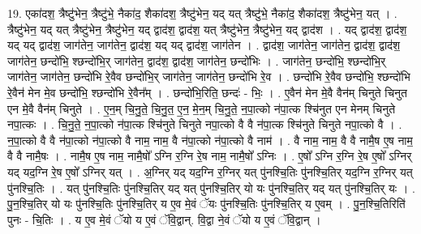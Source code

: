 \documentclass[17pt]{extarticle}
\begin{document}
19. एका॑दश॒ त्रैष्टु॑भेन॒ त्रैष्टु॑भे॒ नैका॑द॒ शैका॑दश॒ त्रैष्टु॑भेन॒ यद् यत् त्रैष्टु॑भे॒ नैका॑द॒ 
शैका॑दश॒ त्रैष्टु॑भेन॒ यत् । . त्रैष्टु॑भेन॒ यद् यत् त्रैष्टु॑भेन॒ त्रैष्टु॑भेन॒ यद् द्वाद॑श॒ द्वाद॑श॒ यत् त्रैष्टु॑भेन॒ त्रैष्टु॑भेन॒ यद् द्वाद॑श । . यद् द्वाद॑श॒ द्वाद॑श॒ यद् यद् द्वाद॑श॒ जाग॑तेन॒ जाग॑तेन॒ द्वाद॑श॒ यद् यद् द्वाद॑श॒ जाग॑तेन । . द्वाद॑श॒ जाग॑तेन॒ जाग॑तेन॒ द्वाद॑श॒ द्वाद॑श॒ जाग॑तेन॒ छन्दो॑भि॒ श्छन्दो॑भि॒र् जाग॑तेन॒ द्वाद॑श॒ द्वाद॑श॒ जाग॑तेन॒ छन्दो॑भिः । . जाग॑तेन॒ छन्दो॑भि॒ श्छन्दो॑भि॒र् जाग॑तेन॒ जाग॑तेन॒ छन्दो॑भि रे॒वैव छन्दो॑भि॒र् जाग॑तेन॒ जाग॑तेन॒ छन्दो॑भि रे॒व । . छन्दो॑भि रे॒वैव छन्दो॑भि॒ श्छन्दो॑भि रे॒वैन॑ मेन मे॒व छन्दो॑भि॒ श्छन्दो॑भि रे॒वैन᳚म् । . छन्दो॑भि॒रिति॒ छन्दः॑ - भिः॒ । . ए॒वैन॑ मेन मे॒वै वैन॑म् चिनुते चिनुत एन मे॒वै वैन॑म् चिनुते । . ए॒न॒म् चि॒नु॒ते॒ चि॒नु॒त॒ ए॒न॒ मे॒न॒म् चि॒नु॒ते॒ न॒पा॒त्को न॑पा॒त्क श्चि॑नुत एन मेनम् चिनुते नपा॒त्कः । . चि॒नु॒ते॒ न॒पा॒त्को न॑पा॒त्क श्चि॑नुते चिनुते नपा॒त्को वै वै न॑पा॒त्क श्चि॑नुते चिनुते नपा॒त्को वै । . न॒पा॒त्को वै वै न॑पा॒त्को न॑पा॒त्को वै नाम॒ नाम॒ वै न॑पा॒त्को न॑पा॒त्को वै नाम॑ । . वै नाम॒ नाम॒ वै वै नामै॒ष ए॒ष नाम॒ वै वै नामै॒षः । . नामै॒ष ए॒ष नाम॒ नामै॒षो᳚ ऽग्नि र॒ग्नि रे॒ष नाम॒ नामै॒षो᳚ ऽग्निः । . ए॒षो᳚ ऽग्नि र॒ग्नि रे॒ष ए॒षो᳚ ऽग्निर् यद् यद॒ग्नि रे॒ष ए॒षो᳚ ऽग्निर् यत् । . अ॒ग्निर् यद् यद॒ग्नि र॒ग्निर् यत् पु॑नश्चि॒तिः पु॑नश्चि॒तिर् यद॒ग्नि र॒ग्निर् यत् पु॑नश्चि॒तिः । . यत् पु॑नश्चि॒तिः पु॑नश्चि॒तिर् यद् यत् पु॑नश्चि॒तिर् यो यः पु॑नश्चि॒तिर् यद् यत् पु॑नश्चि॒तिर् यः । . पु॒न॒श्चि॒तिर् यो यः पु॑नश्चि॒तिः पु॑नश्चि॒तिर् य ए॒व मे॒वं ॅयः पु॑नश्चि॒तिः पु॑नश्चि॒तिर् य ए॒वम् । . पु॒न॒श्चि॒तिरिति॑ पुनः - चि॒तिः । . य ए॒व मे॒वं ॅयो य ए॒वं ॅवि॒द्वान्. वि॒द्वा ने॒वं ॅयो य ए॒वं ॅवि॒द्वान् । \newline
\end{document}
